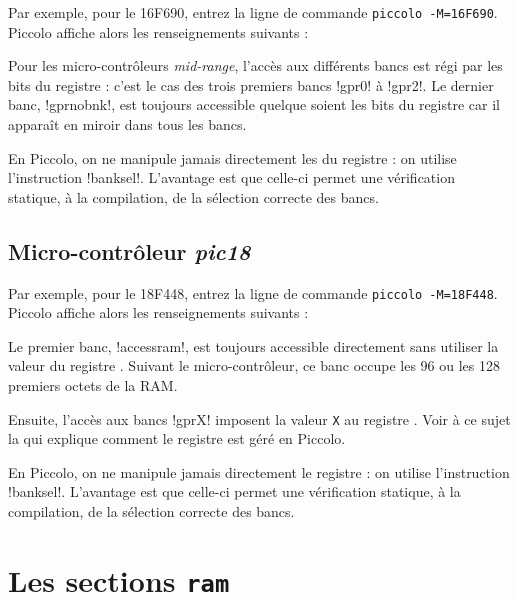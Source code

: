 Par exemple, pour le 16F690, entrez la ligne de commande \texttt{piccolo -M=16F690}. Piccolo affiche alors les renseignements suivants :



Pour les micro-contrôleurs \emph{mid-range}, l'accès aux différents bancs est régi par les bits  du registre  : c'est le cas des trois premiers bancs \pic!gpr0! à \pic!gpr2!. Le dernier banc, \pic!gprnobnk!, est toujours accessible quelque soient les bits  du registre  car il apparaît en miroir dans tous les bancs.

En Piccolo, on ne manipule jamais directement les  du registre  : on utilise l'instruction \pic!banksel!. L'avantage est que celle-ci permet une vérification statique, à la compilation, de la sélection correcte des bancs.


\subsection{Micro-contrôleur \emph{pic18}}

Par exemple, pour le 18F448, entrez la ligne de commande \texttt{piccolo -M=18F448}. Piccolo affiche alors les renseignements suivants :



Le premier banc, \pic!accessram!, est toujours accessible directement sans utiliser la valeur du registre . Suivant le micro-contrôleur, ce banc occupe les 96 ou les 128 premiers octets de la RAM.

Ensuite, l'accès aux bancs \pic!gprX! imposent la valeur \texttt{X} au registre . Voir à ce sujet la  qui explique comment le registre  est géré en Piccolo.

En Piccolo, on ne manipule jamais directement le registre  : on utilise l'instruction \pic!banksel!. L'avantage est que celle-ci permet une vérification statique, à la compilation, de la sélection correcte des bancs.







\section{Les sections \texttt{ram}}

